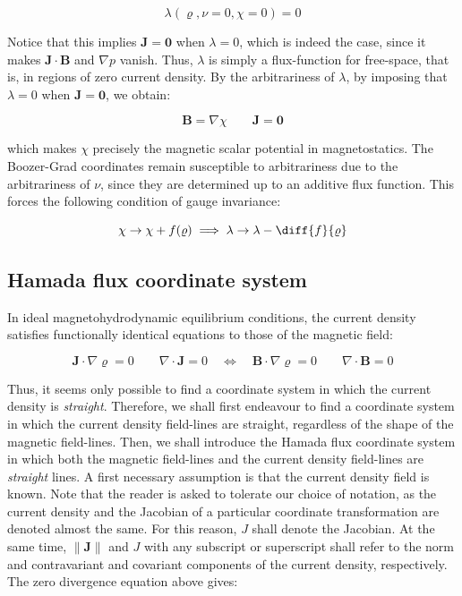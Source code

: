 \begin{equation}
    \lambda(\varrho,\nu=0,\chi=0)=0
\end{equation}

Notice that this implies $\mathbf{J}=\mathbf{0}$ when $\lambda=0$, which is indeed the case, since it makes $\mathbf{J}\cdot\mathbf{B}$ and $\nabla p$ vanish. Thus, $\lambda$ is simply a flux-function for free-space, that is, in regions of zero current density. By the arbitrariness of $\lambda$, by imposing that $\lambda=0$ when $\mathbf{J}=\mathbf{0}$, we obtain:

\begin{equation}
    \mathbf{B}=\nabla\chi\qquad\mathbf{J}=\mathbf{0}
\end{equation}

which makes $\chi$ precisely the magnetic scalar potential in magnetostatics. The Boozer-Grad coordinates remain susceptible to arbitrariness due to the arbitrariness of $\nu$, since they are determined up to an additive flux function. This forces the following condition of gauge invariance:

\begin{equation}
    \chi\to\chi+f(\varrho)\implies\lambda\to\lambda-\diff{f}{\varrho}
\end{equation}

\subsection{Hamada flux coordinate system}

In ideal magnetohydrodynamic equilibrium conditions, the current density satisfies functionally identical equations to those of the magnetic field:

\begin{equation}
    \mathbf{J}\cdot\nabla\varrho=0\qquad\nabla\cdot\mathbf{J}=0\quad\Longleftrightarrow\quad\mathbf{B}\cdot\nabla\varrho=0\qquad\nabla\cdot\mathbf{B}=0
\end{equation}

Thus, it seems only possible to find a coordinate system in which the current density is \textit{straight}. Therefore, we shall first endeavour to find a coordinate system in which the current density field-lines are straight, regardless of the shape of the magnetic field-lines. Then, we shall introduce the Hamada flux coordinate system in which both the magnetic field-lines and the current density field-lines are \textit{straight} lines. A first necessary assumption is that the current density field is known. Note that the reader is asked to tolerate our choice of notation, as the current density and the Jacobian of a particular coordinate transformation are denoted almost the same. For this reason, $J$ shall denote the Jacobian. At the same time, $\|\mathbf{J}\|$ and $J$ with any subscript or superscript shall refer to the norm and contravariant and covariant components of the current density, respectively. The zero divergence equation above gives:

